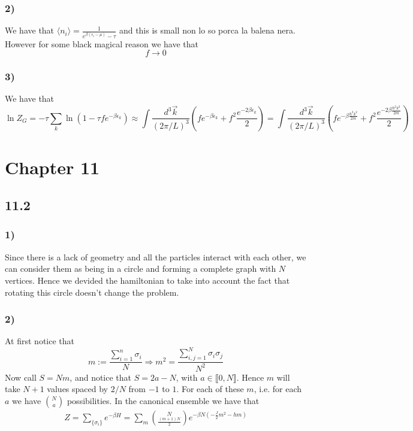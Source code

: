 \documentclass[10pt,a4paper]{book}
\begin{document}
\subsection*{2)}
We have that $\langle n_i\rangle =\frac{1}{e^{\beta(\epsilon_i-\mu)}-\tau}$ and this is small non lo so porca la balena nera. However for some black magical reason we have that 
$$f\to 0$$

\subsection*{3)}
We have that
$$\ln Z_G=-\tau\sum_k\ln(1-\tau f e^{-\beta\epsilon_k})\approx\int\frac{d^3\vec{k}}{(2\pi/L)^3}(fe^{-\beta\epsilon_k}+f^2\frac{e^{-2\beta\epsilon_k}}{2})=\int\frac{d^3\vec{k}}{(2\pi/L)^3}(fe^{-\beta\frac{\hbar^2 k^2}{2m}}+f^2\frac{e^{-2\beta\frac{\hbar^2 k^2}{2m}}}{2})$$




\chapter*{Chapter 11}


\section*{11.2}

\subsection*{1)}
Since there is a lack of geometry and all the particles interact with each other, we can consider them as being in a circle and forming a complete graph with $N$ vertices. Hence we devided the hamiltonian to take into account the fact that rotating this circle doesn't change the problem.

\subsection*{2)}
At first notice that 
$$m:=\frac{\sum_{i=1}^n\sigma_i}{N} \Rightarrow m^2=\frac{\sum_{i,j=1}^N\sigma_i\sigma_j}{N^2}$$
Now call $S=Nm$, and notice that $S=2a-N$, with $a\in\llbracket 0,N\rrbracket$. Hence $m$ will take $N+1$ values spaced by $2/N$ from $-1$ to $1$. For each of these $m$, i.e. for each $a$ we have $\binom{N}{a}$ possibilities. In the canonical ensemble we have that 
\begin{align*}
Z=\sum_{\{\sigma_i\}} e^{-\beta H}=\sum_{m} \binom{N}{\frac{(m+1)N}{2}}e^{-\beta N(-\frac{J}{2}m^2-hm)}
\end{align*}
\end{document}
